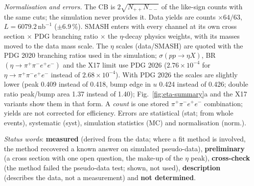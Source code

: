 \documentclass[11pt,a4paper]{article}
\newcommand{\ppee}{\ensuremath{\pi^{+}\pi^{-}e^{+}e^{-}}\xspace}
\newcommand{\nbinv}{\ensuremath{\mathrm{nb}^{-1}}\xspace}
\newcommand{\sigeta}{\ensuremath{\sigma(pp\to\eta X)}\xspace}
\begin{document}
\emph{Normalisation and errors.} The CB is $2\sqrt{N_{++}N_{--}}$ of the like-sign counts with the same cuts; the simulation never provides
it. Data yields are counts $\times64/63$, $L=6079.2\,\nbinv$ ($\pm6.9$\,\%). SMASH enters with every channel at its own cross section
$\times$ PDG branching ratio $\times$ the $\eta$-decay physics weights, with its masses moved to the data mass scale. The $\eta$ scales
(data/SMASH) are quoted with the PDG 2020 branching ratios used in the simulation; \sigeta, BR$(\eta\to\ppee)$ and the X17 limit use PDG 2026
($2.76\times10^{-4}$ for $\eta\to\ppee$ instead of $2.68\times10^{-4}$). With PDG 2026 the scales are slightly lower (peak 0.409 instead of
0.418, bump edge in $u$ 0.424 instead of 0.426; double ratio peak/bump area 1.37 instead of 1.40); Fig.~\ref{fig:eta-summary}a and the X17
variants show them in that form. A \emph{count} is one stored \ppee combination; yields are not corrected for efficiency. Errors are statistical
(stat; from whole events), systematic (syst), simulation statistics (MC) and normalisation (norm.).

\emph{Status words}: \textbf{measured} (derived from the data; where a fit method is involved, the method recovered a known answer on
simulated pseudo-data), \textbf{preliminary} (a cross section with one open question, the make-up of the $\eta$ peak), \textbf{cross-check}
(the method failed the pseudo-data test; shown, not used), \textbf{description} (describes the data, not a measurement) and \textbf{not
determined}.
\end{document}
